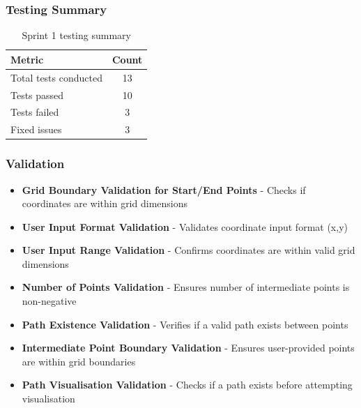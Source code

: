 \subsubsection{Testing Summary}
\begin{table}[htbp]
\centering
\begin{tabular}{|l|c|}
\hline
\textbf{Metric} & \textbf{Count} \\
\hline
Total tests conducted & 13 \\
\hline
Tests passed & 10 \\
\hline
Tests failed & 3 \\
\hline
Fixed issues & 3 \\
\hline
\end{tabular}
\caption{Sprint 1 testing summary}
\end{table}

\subsubsection{Validation}
    \begin{itemize}
    \item \textbf{Grid Boundary Validation for Start/End Points} - Checks if coordinates are within grid dimensions
    \item \textbf{User Input Format Validation} - Validates coordinate input format (x,y)
    \item \textbf{User Input Range Validation} - Confirms coordinates are within valid grid dimensions
    \item \textbf{Number of Points Validation} - Ensures number of intermediate points is non-negative
    \item \textbf{Path Existence Validation} - Verifies if a valid path exists between points
    \item \textbf{Intermediate Point Boundary Validation} - Ensures user-provided points are within grid boundaries
    \item \textbf{Path Visualisation Validation} - Checks if a path exists before attempting visualisation
\end{itemize}

